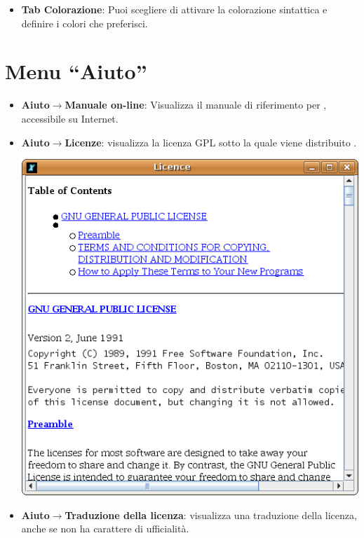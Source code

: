 \begin{itemize}
\begin{itemize}
\begin{center}
			\end{center}
			\vspace{0.25cm}
			\item \textbf{Tab Colorazione}: Puoi scegliere di attivare la colorazione sintattica e definire i colori che preferisci.
		\end{itemize}
	\end{itemize}
	\section{Menu ``Aiuto''}
	\begin{itemize}
		\item \textbf{Aiuto$\to$Manuale on-line}: Visualizza il manuale di riferimento per \xlogo, accessibile su Internet.
		\vspace{0.25cm}
		\item \textbf{Aiuto$\to$Licenze}: visualizza la licenza GPL sotto la quale viene distribuito \xlogo.
		\begin{center}
			\includegraphics[scale=0.4]{pics/interface-CaptureLicence.png}
		\end{center}
		\vspace{0.25cm}
		\item \textbf{Aiuto$\to$Traduzione della licenza}: visualizza una traduzione della licenza, anche se non ha carattere di ufficialità.

\end{itemize}
